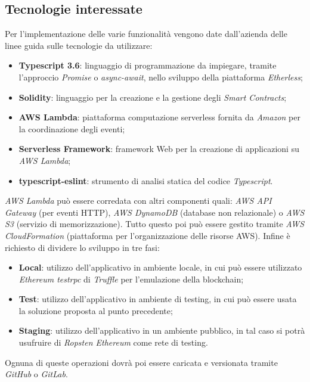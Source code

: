     \subsection{Tecnologie interessate}
        Per l'implementazione delle varie funzionalità vengono date dall'azienda delle linee guida sulle tecnologie da utilizzare:
        \begin{itemize}
            \item \textbf{Typescript 3.6}: linguaggio di programmazione da impiegare, tramite l'approccio \textit{Promise} o \textit{async-await}, nello sviluppo della piattaforma \textit{Etherless};
            \item \textbf{Solidity}: linguaggio per la creazione e la gestione degli \textit{Smart Contracts};
            \item \textbf{AWS Lambda}: piattaforma computazione serverless fornita da \textit{Amazon} per la coordinazione degli eventi;
            \item \textbf{Serverless Framework}: framework Web per la creazione di applicazioni su \textit{AWS Lambda};
            \item \textbf{typescript-eslint}: strumento di analisi statica del codice \textit{Typescript}.
        \end{itemize}
        \textit{AWS Lambda} può essere corredata con altri componenti quali: \textit{AWS API Gateway} (per eventi HTTP), \textit{AWS DynamoDB} (database non relazionale)
        o \textit{AWS S3} (servizio di memorizzazione). Tutto questo poi può essere gestito tramite \textit{AWS CloudFormation} (piattaforma per l'organizzazione delle
        risorse AWS). Infine è richiesto di dividere lo sviluppo in tre fasi:
        \begin{itemize}
            \item \textbf{Local}: utilizzo dell'applicativo in ambiente locale, in cui può essere utilizzato \textit{Ethereum testrpc} di \textit{Truffle} per
            l'emulazione della blockchain;
            \item \textbf{Test}: utilizzo dell'applicativo in ambiente di testing, in cui può essere usata la soluzione proposta al punto precedente;
            \item \textbf{Staging}: utilizzo dell'applicativo in un ambiente pubblico, in tal caso si potrà usufruire di \textit{Ropsten Ethereum} come rete di testing.
        \end{itemize}
        Ognuna di queste operazioni dovrà poi essere caricata e versionata tramite \textit{GitHub} o \textit{GitLab}.
